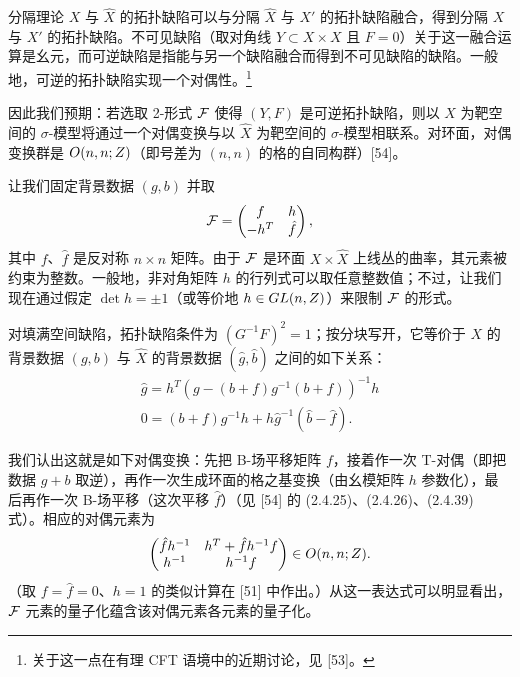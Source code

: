 分隔理论 $X$ 与 $\hat X$ 的拓扑缺陷可以与分隔 $\hat X$ 与 $X'$ 的拓扑缺陷融合，得到分隔 $X$ 与 $X'$ 的拓扑缺陷。不可见缺陷（取对角线 $Y\subset X\times X$ 且 $F=0$）关于这一融合运算是幺元，而可逆缺陷是指能与另一个缺陷融合而得到不可见缺陷的缺陷。一般地，可逆的拓扑缺陷实现一个对偶性。\footnote{关于这一点在有理 CFT 语境中的近期讨论，见 [53]。}

因此我们预期：若选取 2-形式 $\mathcal{F}$ 使得 $(Y,F)$ 是可逆拓扑缺陷，则以 $X$ 为靶空间的 $\sigma$-模型将通过一个对偶变换与以 $\hat X$ 为靶空间的 $\sigma$-模型相联系。对环面，对偶变换群是 $O(n,n;Z)$（即号差为 $(n,n)$ 的格的自同构群）[54]。

让我们固定背景数据 $(g,b)$ 并取
\[
\mathcal{F}=\begin{pmatrix}f&h\\ -h^T&\hat f\end{pmatrix},
\]
其中 $f$、$\hat f$ 是反对称 $n\times n$ 矩阵。由于 $\mathcal{F}$ 是环面 $X\times\hat X$ 上线丛的曲率，其元素被约束为整数。一般地，非对角矩阵 $h$ 的行列式可以取任意整数值；不过，让我们现在通过假定 $\det h=\pm1$（或等价地 $h\in GL(n,Z)$）来限制 $\mathcal{F}$ 的形式。

对填满空间缺陷，拓扑缺陷条件为 $(G^{-1}F)^2=1$；按分块写开，它等价于 $X$ 的背景数据 $(g,b)$ 与 $\hat X$ 的背景数据 $(\hat g,\hat b)$ 之间的如下关系：
\begin{gather*}
\hat g=h^T\left(g-(b+f)g^{-1}(b+f)\right)^{-1}h \\
0=(b+f)g^{-1}h+h\hat g^{-1}(\hat b-\hat f). 
\end{gather*}

我们认出这就是如下对偶变换：先把 B-场平移矩阵 $f$，接着作一次 T-对偶（即把数据 $g+b$ 取逆），再作一次生成环面的格之基变换（由幺模矩阵 $h$ 参数化），最后再作一次 B-场平移（这次平移 $\hat f$）（见 [54] 的 (2.4.25)、(2.4.26)、(2.4.39) 式）。相应的对偶元素为
\[
\begin{pmatrix}\hat f h^{-1}&h^T+\hat f h^{-1}f\\ h^{-1}&h^{-1}f\end{pmatrix}\in O(n,n;Z).
\]
（取 $f=\hat f=0$、$h=1$ 的类似计算在 [51] 中作出。）从这一表达式可以明显看出，$\mathcal{F}$ 元素的量子化蕴含该对偶元素各元素的量子化。
